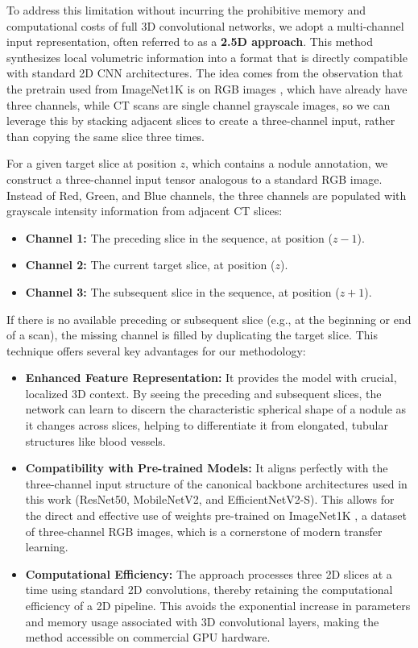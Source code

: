 To address this limitation without incurring the prohibitive memory and computational costs of full 3D convolutional networks, we adopt a multi-channel input representation, often referred to as a \textbf{2.5D approach}. This method synthesizes local volumetric information into a format that is directly compatible with standard 2D CNN architectures.
The idea comes from the observation that the pretrain used from ImageNet1K is on RGB images \cite{russakovsky2015imagenet}, which have already have three channels, while CT scans are single channel grayscale images, so we can leverage this by stacking adjacent slices to create a three-channel input, rather than copying the same slice three times.

For a given target slice at position $z$, which contains a nodule annotation, we construct a three-channel input tensor analogous to a standard RGB image. Instead of Red, Green, and Blue channels, the three channels are populated with grayscale intensity information from adjacent CT slices:

\begin{itemize}
    \item \textbf{Channel 1:} The preceding slice in the sequence, at position ($z-1$).
    \item \textbf{Channel 2:} The current target slice, at position ($z$).
    \item \textbf{Channel 3:} The subsequent slice in the sequence, at position ($z+1$).
\end{itemize}
If there is no available preceding or subsequent slice (e.g., at the beginning or end of a scan), the missing channel is filled by duplicating the target slice.
This technique offers several key advantages for our methodology:

\begin{itemize}
    \item \textbf{Enhanced Feature Representation:} It provides the model with crucial, localized 3D context. By seeing the preceding and subsequent slices, the network can learn to discern the characteristic spherical shape of a nodule as it changes across slices, helping to differentiate it from elongated, tubular structures like blood vessels.

    \item \textbf{Compatibility with Pre-trained Models:} It aligns perfectly with the three-channel input structure of the canonical backbone architectures used in this work (ResNet50, MobileNetV2, and EfficientNetV2-S). This allows for the direct and effective use of weights pre-trained on ImageNet1K \cite{russakovsky2015imagenet}, a dataset of three-channel RGB images, which is a cornerstone of modern transfer learning.

    \item \textbf{Computational Efficiency:} The approach processes three 2D slices at a time using standard 2D convolutions, thereby retaining the computational efficiency of a 2D pipeline. This avoids the exponential increase in parameters and memory usage associated with 3D convolutional layers, making the method accessible on commercial GPU hardware.
\end{itemize}

